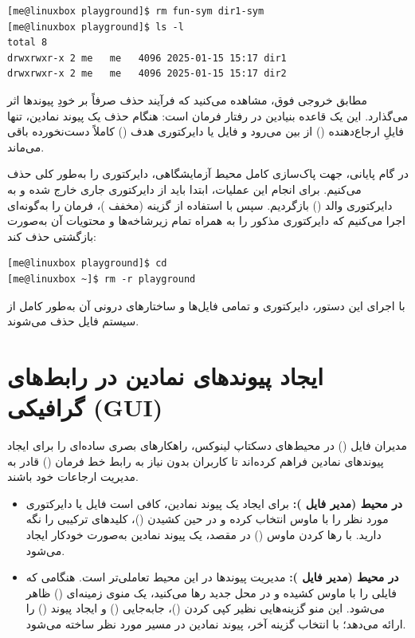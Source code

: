 \begin{latin}
\begin{lstlisting}
[me@linuxbox playground]$ rm fun-sym dir1-sym
[me@linuxbox playground]$ ls -l
total 8
drwxrwxr-x 2 me   me   4096 2025-01-15 15:17 dir1
drwxrwxr-x 2 me   me   4096 2025-01-15 15:17 dir2
\end{lstlisting}
\end{latin}

مطابق خروجی فوق، مشاهده می‌کنید که فرآیند حذف صرفاً بر خودِ پیوندها اثر می‌گذارد. این یک قاعده بنیادین در رفتار فرمان  است: هنگام حذف یک پیوند نمادین، تنها فایلِ ارجاع‌دهنده () از بین می‌رود و فایل یا دایرکتوری هدف () کاملاً دست‌نخورده باقی می‌ماند.

در گام پایانی، جهت پاک‌سازی کامل محیط آزمایشگاهی، دایرکتوری  را به‌طور کلی حذف می‌کنیم. برای انجام این عملیات، ابتدا باید از دایرکتوری جاری خارج شده و به دایرکتوری والد () بازگردیم. سپس با استفاده از گزینه  (مخفف )، فرمان  را به‌گونه‌ای اجرا می‌کنیم که دایرکتوری مذکور را به همراه تمام زیرشاخه‌ها و محتویات آن به‌صورت بازگشتی حذف کند:

\begin{latin}
\begin{lstlisting}
[me@linuxbox playground]$ cd
[me@linuxbox ~]$ rm -r playground
\end{lstlisting}
\end{latin}

با اجرای این دستور، دایرکتوری  و تمامی فایل‌ها و ساختارهای درونی آن به‌طور کامل از سیستم فایل حذف می‌شوند.

\section{ایجاد پیوندهای نمادین در رابط‌های گرافیکی (GUI)}

مدیران فایل () در محیط‌های دسکتاپ لینوکس، راهکارهای بصری ساده‌ای را برای ایجاد پیوندهای نمادین فراهم کرده‌اند تا کاربران بدون نیاز به رابط خط فرمان () قادر به مدیریت ارجاعات خود باشند.

\begin{itemize}
  \item \textbf{در محیط  (مدیر فایل ):} برای ایجاد یک پیوند نمادین، کافی است فایل یا دایرکتوری مورد نظر را با ماوس انتخاب کرده و در حین کشیدن ()، کلیدهای ترکیبی  را نگه دارید. با رها کردن ماوس () در مقصد، یک پیوند نمادین به‌صورت خودکار ایجاد می‌شود.

  \item \textbf{در محیط  (مدیر فایل ):} مدیریت پیوندها در این محیط تعاملی‌تر است. هنگامی که فایلی را با ماوس کشیده و در محل جدید رها می‌کنید، یک منوی زمینه‌ای () ظاهر می‌شود. این منو گزینه‌هایی نظیر کپی کردن ()، جابه‌جایی () و ایجاد پیوند () را ارائه می‌دهد؛ با انتخاب گزینه آخر، پیوند نمادین در مسیر مورد نظر ساخته می‌شود.
\end{itemize}

